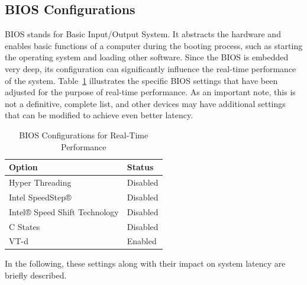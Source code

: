 \documentclass[MMR,Master,english]{style/twbook}
\begin{document}
\clearpage

\subsection{BIOS Configurations}\label{subsec:bios_configurations}

BIOS stands for Basic Input/Output System. It abstracts the hardware and enables basic functions of a computer during the booting process, such as starting the operating system and loading other software. Since the BIOS is embedded very deep, its configuration can significantly influence the real-time performance of the system. Table~\ref{tab:bios_configuration} illustrates the specific BIOS settings that have been adjusted for the purpose of real-time performance. As an important note, this is not a definitive, complete list, and other devices may have additional settings that can be modified to achieve even better latency.

\begin{table}[H]
	\centering
	\caption{BIOS Configurations for Real-Time Performance}
	\label{tab:bios_configuration}
	\setlength{\tabcolsep}{0.5em} %
	{\renewcommand{\arraystretch}{1.2}%
		\begin{tabular}{|l|l|}
			\hline
			\textbf{Option}               & \textbf{Status} \\
			\hline
			Hyper Threading               & Disabled        \\
			\hline
			Intel SpeedStep®              & Disabled        \\
			\hline
			Intel® Speed Shift Technology & Disabled        \\
			\hline
			C States                      & Disabled        \\
			\hline
			VT-d                          & Enabled         \\
			\hline
		\end{tabular}}
\end{table}

\noindent In the following, these settings along with their impact on system latency are briefly described.
\end{document}
